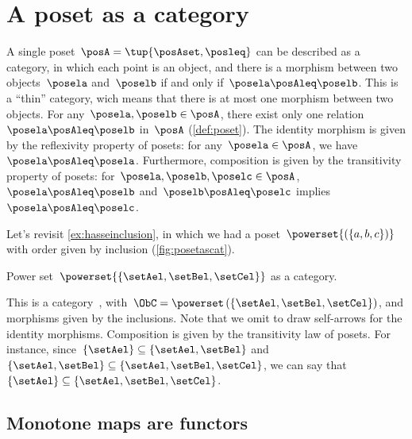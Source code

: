 

\section{A poset as a category}
\label{sec:posetsarecats}

A single poset~$\posA=\tup{\posAset, \posleq}$ can be described as a category, in which each point is an object, and there is a morphism between two objects~$\posela$ and~$\poselb$ if and only if~$\posela \posAleq \poselb$.
This is a ``thin'' category, wich means that there is at most one morphism between two objects.
For any~$\posela,\poselb\in \posA$, there exist only one relation~$\posela\posAleq \poselb$ in~$\posA$ (\cref{def:poset}).
The identity morphism is given by the reflexivity property of posets: for any~$\posela\in \posA$, we have~$\posela \posAleq \posela$.
Furthermore, composition is given by the transitivity property of posets: for~$\posela,\poselb,\poselc \in \posA$,~$\posela\posAleq \poselb$ and~$\poselb\posAleq \poselc$ implies~$\posela\posAleq \poselc$.

\begin{example}
    Let's revisit \cref{ex:hasseinclusion}, in which we had a poset~$\powerset{\left(\{a,b,c\}\right)}$ with order given by inclusion (\cref{fig:posetascat}).

    \begin{marginfigure}
        \centering
        \caption{Power set~$\powerset{\{\setAel,\setBel,\setCel\}}$ as a category. \label{fig:posetascat}}
    \end{marginfigure}

    This is a category~\CatC, with~$\ObC=\powerset\left(\{\setAel,\setBel,\setCel\}\right)$, and morphisms given by the inclusions.
    Note that we omit to draw self-arrows for the identity morphisms.
    Composition is given by the transitivity law of posets. For instance, since~$\{\setAel\}\subseteq \{\setAel,\setBel\}$ and~$\{\setAel,\setBel\} \subseteq \{\setAel,\setBel,\setCel\}$, we can say that~$\{\setAel\}\subseteq \{\setAel,\setBel,\setCel\}$.
\end{example}

\subsection{Monotone maps are functors}

